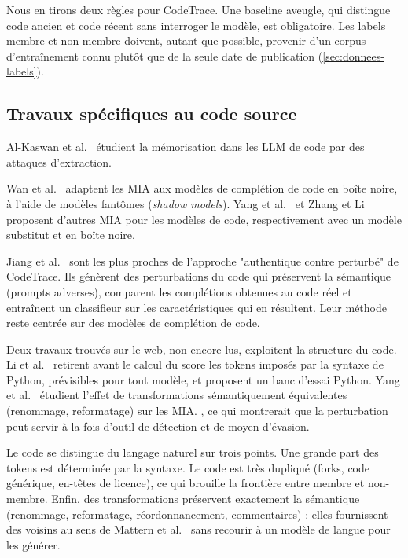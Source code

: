 		Nous en tirons deux règles pour CodeTrace. Une baseline aveugle, qui distingue code ancien et code récent sans interroger le modèle, est obligatoire. Les labels membre et non-membre doivent, autant que possible, provenir d'un corpus d'entraînement connu plutôt que de la seule date de publication (\cref{sec:donnees-labels}).

	\subsection{Travaux spécifiques au code source}\label{sec:ea-code}
		Al-Kaswan et al.~\cite{alkaswan2024} étudient la mémorisation dans les LLM de code par des attaques d'extraction. 

		Wan et al.~\cite{wan2024} adaptent les MIA aux modèles de complétion de code en boîte noire, à l'aide de modèles fantômes (\emph{shadow models}).  Yang et al.~\cite{yang2024} et Zhang et Li~\cite{zhang2023} proposent d'autres MIA pour les modèles de code, respectivement avec un modèle substitut et en boîte noire.

		Jiang et al.~\cite{jiang2025} sont les plus proches de l'approche "authentique contre perturbé" de CodeTrace. Ils génèrent des perturbations du code qui préservent la sémantique (prompts adverses), comparent les complétions obtenues au code réel et entraînent un classifieur sur les caractéristiques qui en résultent. Leur méthode reste centrée sur des modèles de complétion de code.

		Deux travaux trouvés sur le web, non encore lus, exploitent la structure du code. Li et al.~\cite{li2025} retirent avant le calcul du score les tokens imposés par la syntaxe de Python, prévisibles pour tout modèle, et proposent un banc d'essai Python. Yang et al.~\cite{yang2025} étudient l'effet de transformations sémantiquement équivalentes (renommage, reformatage) sur les MIA. , ce qui montrerait que la perturbation peut servir à la fois d'outil de détection et de moyen d'évasion.

		Le code se distingue du langage naturel sur trois points. Une grande part des tokens est déterminée par la syntaxe. Le code est très dupliqué (forks, code générique, en-têtes de licence), ce qui brouille la frontière entre membre et non-membre. Enfin, des transformations préservent exactement la sémantique (renommage, reformatage, réordonnancement, commentaires) : elles fournissent des voisins au sens de Mattern et al.~\cite{mattern2023} sans recourir à un modèle de langue pour les générer.

